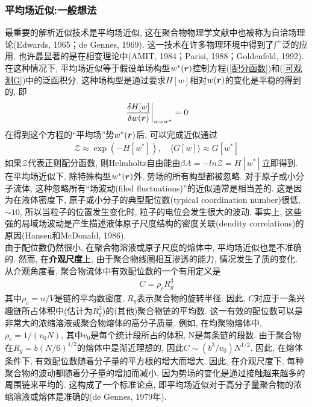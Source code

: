\subsubsection{平均场近似:一般想法}
最重要的解析近似技术是平均场近似, 这在聚合物物理学文献中也被称为自洽场理论(Edwards, 1965；de Gennes, 1969). 这一技术在许多物理环境中得到了广泛的应用, 也许最显著的是在相变理论中(AMIT, 1984；Parisi, 1988；Goldenfeld, 1992). 在这种情况下, 平均场近似等于假设单场构型$w^*(\bm{r})$控制方程(\ref{配分函数})和(\ref{可观测G})中的泛函积分. 这种场构型是通过要求$H[w]$相对$w(\bm{r})$的变化是平稳的得到的, 即\\
\begin{gather}
	\left. \frac{\delta H[w]}{\delta w(\bm{r})}\right|_{w=w^*} =0 \label{H[w]相对w(r)的变化}
\end{gather}
在得到这个方程的“平均场”势$w^*(\bm{r})$后, 可以完成近似通过\\
\begin{gather}
	\mathcal{Z} \approx \exp(-H[w^*]),\quad \langle G[w]\rangle \approx G[w^*]
\end{gather}
如果$\mathcal{Z}$代表正则配分函数, 则Helmholtz自由能由$\beta A = -ln\mathcal{Z} = H[w^*]$立即得到. \\

在平均场近似下, 除特殊构型$w^*(\bm{r})$外, 势场的所有构型都被忽略. 对于原子或小分子流体, 这种忽略所有“场波动(filed fluctuations)”的近似通常是相当差的. 这是因为在液体密度下, 原子或小分子的典型配位数(typical coordination number)很低, $\sim 10$, 所以当粒子的位置发生变化时, 粒子的电位会发生很大的波动. 事实上, 这些强的局域场波动是产生描述液体原子尺度结构的密度关联(dendity correlations)的原因(Hansen和McDonald, 1986). \\

由于配位数仍然很小, 在聚合物溶液或原子尺度的熔体中, 平均场近似也是不准确的. 然而, 在\textbf{介观尺度}上, 由于聚合物线圈相互渗透的能力, 情况发生了质的变化. 从介观角度看, 聚合物流体中有效配位数的一个有用定义是\\
\begin{gather}\label{5.5}
	C=\rho_c R_g^3
\end{gather}
其中$\rho_c=n/V$是链的平均数密度, $R_g$表示聚合物的旋转半径. 因此, $C$对应于一条兴趣链所占体积中(估计为$R_g^3$)的(其他)聚合物链的平均数. 这一有效的配位数可以是非常大的浓缩溶液或聚合物熔体的高分子质量. 例如, 在均聚物熔体中, $\rho_c=1/(v_0N)$, 其中$v_0$是每个统计段所占的体积, N是每条链的段数. 由于聚合物在$R_g=b(N/6)^{1/2}$的熔体中是渐近理想的, 因此$C\sim (b^3/v_0)N^{1/2}$. 因此, 在熔体条件下, 有效配位数随着分子量的平方根的增大而增大. 因此, 在介观尺度下, 每种聚合物的波动都随着分子量的增加而减小, 因为势场的变化是通过接触越来越多的周围链来平均的. 这构成了一个标准论点, 即平均场近似对于高分子量聚合物的浓缩溶液或熔体是准确的(de Gennes, 1979年). \\


